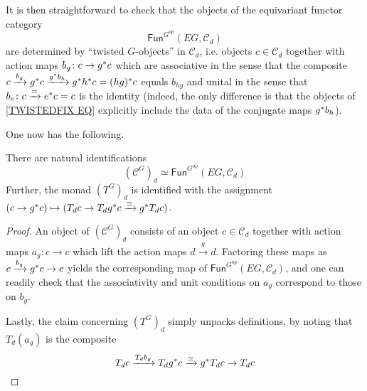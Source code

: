 \documentclass[a4paper,10pt
,draft
]{article}%
\renewcommand{\1}{\eta}%
\begin{document}
It is then straightforward to check that the objects of the equivariant functor category
\begin{equation}\label{TWISTEDFIX EQ}
\mathsf{Fun}^{G^{op}}(EG,\mathcal{C}_d)
\end{equation}
are determined by ``twisted $G$-objects'' in $\mathcal{C}_d$, i.e. objects 
$c\in \mathcal{C}_d$
together with action maps 
$b_g \colon c \to g^{\**}c$
which are associative in the sense that the composite
$c \xrightarrow{b_g} g^{\**}c \xrightarrow{g^{\**}b_h} g^{\**} h^{\**} c = (hg)^{\**}c$ equals $b_{hg}$
and unital in the sense that
$b_e \colon c \xrightarrow{=} e^{\**}c = c$
is the identity
(indeed, the only difference is that the
objects of \ref{TWISTEDFIX EQ} explicitly include the data
of the conjugate maps $g^{\**}b_h$).

One now has the following.



\begin{proposition}
There are natural identifications
\[
\left(\mathcal{C}^G\right)_d \simeq
\mathsf{Fun}^{G^{op}}(EG,\mathcal{C}_d)
\]
Further, the monad $\left(T^G\right)_d$
is identified with the assignment
$(c \to g^{\**}c) \mapsto 
(T_d c \to T_dg^{\**}c \xrightarrow{\simeq} g^{\**}T_d c)$.
\end{proposition}



\begin{proof}
An object of $\left(\mathcal{C}^G\right)_d$
consists of an object $c \in \mathcal{C}_d$ together with action maps
$a_g\colon c \to c$ which lift the action maps $d \xrightarrow{g} d$.
Factoring these maps
as $c \xrightarrow{b_g} g^{\**}c \to c$
yields the corresponding map of $\mathsf{Fun}^{G^{op}}(EG,\mathcal{C}_d)$,
and one can readily check that the associativity and unit conditions on $a_g$ correspond to those on $b_g$.

Lastly, the claim concerning $\left(T^G\right)_d$ simply unpacks definitions, by noting that
$T_d(a_g)$ is the composite
\[
T_d c \xrightarrow{T_d b_g}
T_d g^{\**} c \xrightarrow{\simeq} 
g^{\**} T_d c  \to T_d c 
\]
\end{proof}



{}

\end{document}

